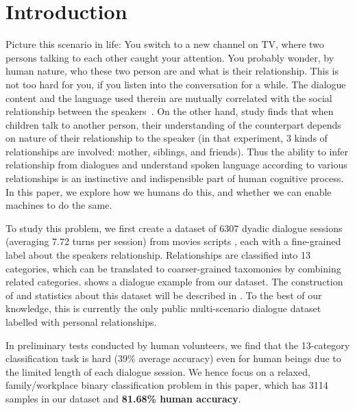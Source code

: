 \section{Introduction}
\label{sec:intro}
Picture this scenario in life: You 
switch to a new channel on TV, where two persons talking to each other 
caught your attention. You probably wonder, by human nature, 
who these two person are and what is their relationship. This is not too hard
for you, if you listen into the conversation for a while. 
The dialogue content and the language used therein are mutually correlated
with the social relationship between the speakers~\cite{flover}. 
On the other hand, study \cite{mind-reading} finds that when children talk to 
another person, their understanding of the counterpart depends on nature of 
their relationship to the speaker (in that experiment, 3 kinds of 
relationships are involved: mother, siblings, and friends). 
Thus the ability to infer relationship from dialogues and understand
spoken language according to various relationships is an instinctive and 
indispensible part of human cognitive process. In this paper, we explore 
how we humans do this, and whether we can enable machines to do the same.

To study this problem, we first create a dataset of 6307 
dyadic dialogue sessions (averaging 7.72 turns per session) from movies scripts
, each with a fine-grained label about the speakers relationship. 
Relationships are classified into 13 categories, which can be translated 
to coarser-grained taxomonies by combining related categories. 
 shows a dialogue example from our dataset. 
The construction of and statistics about this dataset will be 
described in . 
To the best of our knowledge, this is currently the only public 
multi-scenario dialogue dataset labelled with personal relationships. 

In preliminary tests conducted by human volunteers, we find that 
the 13-category classification task is hard
($39\%$ average accuracy) even for human beings due to the limited length 
of each dialogue session. We hence focus on a relaxed, family/workplace binary 
classification problem in this paper, which has 3114 samples in our dataset 
and \textbf{81.68\% human accuracy}. 

